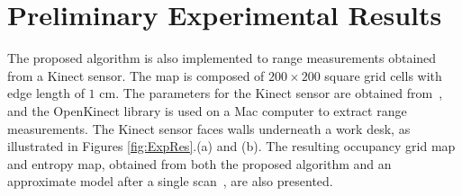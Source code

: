 \documentclass[letterpaper, 10pt, conference]{ieeeconf}
\begin{document}
\section{Preliminary Experimental Results}
\label{sec:ExpRes}


The proposed algorithm is also implemented to range measurements obtained from a Kinect sensor. The map is composed of $200\times200$ square grid cells with edge length of $1$ cm. The parameters for the Kinect sensor are obtained from~\cite{KhoElb12}, and the OpenKinect library is used on a Mac computer to extract range measurements. The Kinect sensor faces walls underneath a work desk, as illustrated in Figures \ref{fig:ExpRes}.(a) and (b). The resulting occupancy grid map and entropy map, obtained from both the proposed algorithm and an approximate model after a single scan~\cite{PirRutBisSch11,KhoElb12}, are also presented. 
\end{document}
